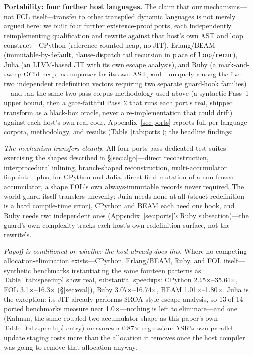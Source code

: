 \documentclass[sigplan,screen,review,anonymous]{acmart}
\begin{document}
\textbf{Portability: four further host languages.} The claim that our
mechanisms---not FOL itself---transfer to other transpiled dynamic
languages is not merely argued here: we built four further
existence-proof ports, each independently reimplementing qualification
and rewrite against that host's own AST and loop construct---CPython
(reference-counted heap, no JIT), Erlang/BEAM (immutable-by-default,
clause-dispatch tail recursion in place of \texttt{loop}/\texttt{recur}),
Julia (an LLVM-based JIT with its own escape analysis), and Ruby (a
mark-and-sweep-GC'd heap, no unparser for its own AST, and---uniquely
among the five---two independent redefinition vectors requiring two
separate guard-hook families)---and ran the same two-pass corpus
methodology used above (a syntactic Pass~1 upper bound, then a
gate-faithful Pass~2 that runs each port's real, shipped transform as a
black-box oracle, never a re-implementation that could drift) against
each host's own real code. Appendix~\ref{sec:ports} reports full
per-language corpora, methodology, and results (Table~\ref{tab:ports});
the headline findings:

\emph{The mechanism transfers cleanly.} All four ports pass dedicated
test suites exercising the shapes described in \S\ref{sec:algo}---direct
reconstruction, interprocedural inlining, branch-shaped reconstruction,
multi-accumulator fixpoints---plus, for CPython and Julia, direct field
mutation of a non-frozen accumulator, a shape FOL's own always-immutable
records never required. The world guard itself transfers unevenly: Julia
needs none at all (struct redefinition is a hard compile-time error),
CPython and BEAM each need one hook, and Ruby needs two independent ones
(Appendix~\ref{sec:ports}'s Ruby subsection)---the guard's own
complexity tracks each host's own redefinition surface, not the
rewrite's.

\emph{Payoff is conditioned on whether the host already does this.}
Where no competing allocation-elimination exists---CPython, Erlang/BEAM,
Ruby, and FOL itself---synthetic benchmarks instantiating the same
fourteen patterns as Table~\ref{tab:speedup} show real, substantial
speedups: CPython 2.95$\times$--35.64$\times$, FOL
3.1$\times$--16.3$\times$ (\S\ref{sec:eval}), Ruby
3.07$\times$--16.74$\times$, BEAM 1.01$\times$--1.80$\times$. Julia is
the exception: its JIT already performs SROA-style escape analysis, so
13 of 14 ported benchmarks measure near 1.0$\times$---nothing is left to
eliminate---and one (Kalman, the same coupled two-accumulator shape as
this paper's own Table~\ref{tab:speedup} entry) measures a 0.87$\times$
regression: ASR's own parallel-update staging costs more than the
allocation it removes once the host compiler was going to remove that
allocation anyway.
\end{document}
